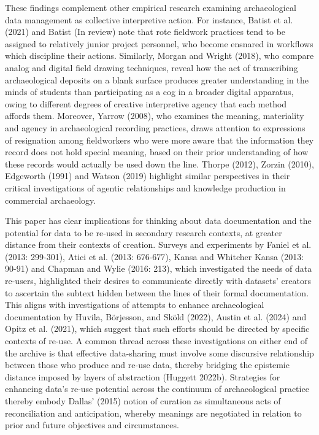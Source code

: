\documentclass[
]{article}
\begin{document}
These findings complement other empirical research examining
archaeological data management as collective interpretive action. For
instance, Batist et al. (2021) and Batist (In review) note that rote
fieldwork practices tend to be assigned to relatively junior project
personnel, who become ensnared in workflows which discipline their
actions. Similarly, Morgan and Wright (2018), who compare analog and
digital field drawing techniques, reveal how the act of transcribing
archaeological deposits on a blank surface produces greater
understanding in the minds of students than participating as a cog in a
broader digital apparatus, owing to different degrees of creative
interpretive agency that each method affords them. Moreover, Yarrow
(2008), who examines the meaning, materiality and agency in
archaeological recording practices, draws attention to expressions of
resignation among fieldworkers who were more aware that the information
they record does not hold special meaning, based on their prior
understanding of how these records would actually be used down the line.
Thorpe (2012), Zorzin (2010), Edgeworth (1991) and Watson (2019)
highlight similar perspectives in their critical investigations of
agentic relationships and knowledge production in commercial
archaeology.

This paper has clear implications for thinking about data documentation
and the potential for data to be re-used in secondary research contexts,
at greater distance from their contexts of creation. Surveys and
experiments by Faniel et al. (2013: 299-301), Atici et al. (2013:
676-677), Kansa and Whitcher Kansa (2013: 90-91) and Chapman and Wylie
(2016: 213), which investigated the needs of data re-users, highlighted
their desires to communicate directly with datasets' creators to
ascertain the subtext hidden between the lines of their formal
documentation. This aligns with investigations of attempts to enhance
archaeological documentation by Huvila, Börjesson, and Sköld (2022),
Austin et al. (2024) and Opitz et al. (2021), which suggest that such
efforts should be directed by specific contexts of re-use. A common
thread across these investigations on either end of the archive is that
effective data-sharing must involve some discursive relationship between
those who produce and re-use data, thereby bridging the epistemic
distance imposed by layers of abstraction (Huggett 2022b). Strategies
for enhancing data's re-use potential across the continuum of
archaeological practice thereby embody Dallas' (2015) notion of curation
as simultaneous acts of reconciliation and anticipation, whereby
meanings are negotiated in relation to prior and future objectives and
circumstances.
\end{document}

